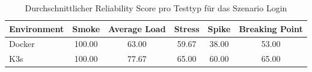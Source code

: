 \begin{table}[htbp]
\centering
\caption{Durchschnittlicher Reliability Score pro Testtyp für das Szenario Login}
\label{tab:scenario_score_matrix_login}

\begin{tabular}{lccccc}
\toprule
\textbf{Environment} & \textbf{Smoke} & \textbf{Average Load} & \textbf{Stress} & \textbf{Spike} & \textbf{Breaking Point} \\
\midrule
Docker & 100.00 & 63.00 & 59.67 & 38.00 & 53.00 \\
K3s    & 100.00 & 77.67 & 65.00 & 60.00 & 65.00 \\
\bottomrule
\end{tabular}

\end{table}

\FloatBarrier